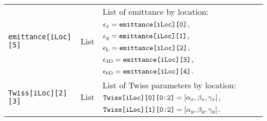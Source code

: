 \begin{sidewaystable}[h]
\begin{center}
\begin{tabular}{|l|c|p{12cm}|}
      \texttt{emittance[iLoc][5]} & List        & List of emittance by location:
                                                  $\epsilon_x      ={\rm \texttt{emittance[iLoc][0]}}$, 
                                                  $\epsilon_y      ={\rm \texttt{emittance[iLoc][1]}}$, 
                                                  $\epsilon_{\rm L} ={\rm \texttt{emittance[iLoc][2]}}$, 
                                                  $\epsilon_{\rm 4D}={\rm \texttt{emittance[iLoc][3]}}$, 
                                                  $\epsilon_{\rm 6D}={\rm \texttt{emittance[iLoc][4]}}$.                \\
      \texttt{Twiss[iLoc][2][3]}  & List        & List of Twiss parameters by location:
                                                  ${\rm \texttt{Twiss[iLoc][0][0:2]}}=[\alpha_x, \beta_x, \gamma_x]$, 
                                                  ${\rm \texttt{Twiss[iLoc][1][0:2]}}=[\alpha_y, \beta_y, \gamma_y]$.  \\
       \hline
    \end{tabular}
  \end{center}
\end{sidewaystable}
